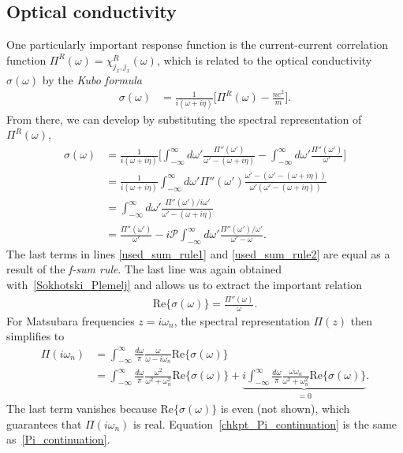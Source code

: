 \documentclass[notitlepage,11pt,nofootinbib]{revtex4-1}
\begin{document}
\subsection{Optical conductivity}

One particularly important response function is the current-current correlation function $\Pi^R(\omega) = \chi_{j_x,j_x}^R(\omega)$, which is related to the optical conductivity $\sigma(\omega)$ by the \emph{Kubo formula}
\begin{align}
\sigma(\omega)
&=
\frac{1}{i(\omega + i\eta)}\bigg[\Pi^R(\omega)-\frac{ne^2}{m}\bigg].
\label{used_sum_rule1}
\end{align}
From there, we can develop by substituting the spectral representation of $\Pi^{R}(\omega)$,
\begin{align}
\sigma(\omega)&=
\frac{1}{i(\omega + i\eta)}
\bigg[
\int_{-\infty}^{\infty}d\omega'\frac{\Pi''(\omega')}{\omega'-(\omega+i\eta)}
-\int_{-\infty}^{\infty}d\omega'\frac{\Pi''(\omega')}{\omega'}
\bigg]
\label{used_sum_rule2}
\\
&=
\frac{1}{i(\omega + i\eta)}
\int_{-\infty}^{\infty}d\omega'
\Pi''(\omega') 
\frac{\omega'-(\omega'-(\omega+i\eta))}{\omega'(\omega'-(\omega+i\eta))}
\\
&=
\int_{-\infty}^{\infty}d\omega'\frac{\Pi''(\omega')/i\omega'}{\omega'-(\omega+i\eta)}
\\
&=
\frac{\Pi''(\omega')}{\omega'}
-i\mathcal P \int_{-\infty}^{\infty}d\omega'\frac{\Pi''(\omega')/\omega'}{\omega'-\omega}.
\label{conductivity_spectral}
\end{align}
The last terms in lines \eqref{used_sum_rule1} and \eqref{used_sum_rule2} are equal as a result of the \emph{f-sum rule}. The last line was again obtained with~\eqref{Sokhotski_Plemelj} and allows us to extract the important relation
\begin{align}
\text{Re}\{ \sigma(\omega) \} = \frac{\Pi''(\omega)}{\omega}.
\end{align}
For Matsubara frequencies $z=i\omega_n$, the spectral representation $\Pi(z)$ then simplifies to
\begin{align}
\Pi(i\omega_n) 
&=
\int_{-\infty}^{\infty} \frac{d\omega}{\pi}\frac{\omega}{\omega-i\omega_n}\text{Re}\{ \sigma(\omega) \}
\label{chkpt_Pi_continuation_1}
\\
&=
\int_{-\infty}^{\infty} \frac{d\omega}{\pi} \frac{\omega^2}{\omega^2+\omega_n^2}
\text{Re}\{ \sigma(\omega) \}
+
\underbrace{i
\int_{-\infty}^{\infty} \frac{d\omega}{\pi} \frac{\omega\omega_n}{\omega^2+\omega_n^2}
\text{Re}\{ \sigma(\omega) \}
}_{=0}.
\label{chkpt_Pi_continuation}
\end{align}
The last term vanishes because $\text{Re}\{\sigma(\omega)\}$ is even (not shown), which guarantees that $\Pi(i\omega_n)$ is real. Equation~\eqref{chkpt_Pi_continuation} is the same as~\eqref{Pi_continuation}.
\end{document}
